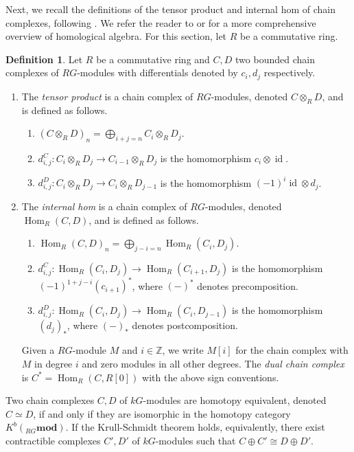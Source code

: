 \documentclass[10pt,letterpaper, boxed, cm]{amsart}
\newcommand{\Z}{\mathbb{Z}}
\newcommand{\Hom}{\operatorname{Hom}}
\newcommand{\id}{\operatorname{id}}
\theoremstyle{remark}
\theoremstyle{definition}
\newtheorem{definition}[theorem]{Definition}
\begin{document}
	Next, we recall the definitions of the tensor product and internal hom of chain complexes, following \cite{W94}. We refer the reader to \cite{W94} or \cite[Sections 1.17 and 1.18]{L181} for a more comprehensive overview of homological algebra. For this section, let $R$ be a commutative ring.

	\begin{definition}
		Let $R$ be a commutative ring and $C, D$ two bounded chain complexes of $RG$-modules with differentials denoted by $c_i, d_j$ respectively.
		\begin{enumerate}
			\item The \textit{tensor product} is a chain complex of $RG$-modules, denoted $C\otimes_R D$, and is defined as follows.
			\begin{enumerate}
				\item $(C\otimes_R D)_n = \bigoplus_{i+j = n} C_i \otimes_R D_j$.
				\item $d^C_{i,j}: C_i \otimes_R D_j \to C_{i-1} \otimes_R D_j$ is the homomorphism $c_i \otimes \id$.
				\item $d^D_{i,j}: C_i \otimes_R D_j \to C_{i} \otimes_R D_{j-1}$ is the homomorphism $(-1)^i\id \otimes d_j$.
			\end{enumerate}

			\item The \textit{internal hom} is a chain complex of $RG$-modules, denoted $\Hom_{R}(C,D)$, and is defined as follows.
			\begin{enumerate}
				\item $\Hom_R(C,D)_n = \bigoplus_{j-i = n} \Hom_R(C_i, D_j)$.
				\item $d^C_{i,j}: \Hom_R(C_i, D_j) \to \Hom_R(C_{i+1}, D_j)$ is the homomorphism $(-1)^{1 + j - i}(c_{i+1})^*$, where $(-)^*$ denotes precomposition.
				\item $d^D_{i, j}: \Hom_R(C_i, D_j) \to \Hom_R(C_i, D_{j-1})$ is the homomorphism $(d_j)_*$, where $(-)_*$ denotes postcomposition.
			\end{enumerate}
			Given a $RG$-module $M$ and $i \in \Z$, we write $M[i]$ for the chain complex with $M$ in degree $i$ and zero modules in all other degrees. The \textit{dual chain complex} is $C^* = \Hom_R(C, R[0])$ with the above sign conventions.
		\end{enumerate}
	\end{definition}

	Two chain complexes $C,D$ of $kG$-modules are homotopy equivalent, denoted $C \simeq D$, if and only if they are isomorphic in the homotopy category $K^b({}_{RG}\mathbf{mod})$. If the Krull-Schmidt theorem holds, equivalently, there exist contractible complexes $C', D'$ of $kG$-modules such that $C \oplus C' \cong D \oplus D'$.
\end{document}
